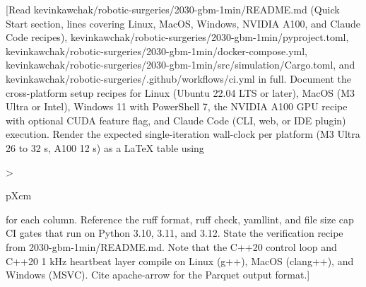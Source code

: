 [Read
kevinkawchak/robotic-surgeries/2030-gbm-1min/README.md (Quick Start
section, lines covering Linux, MacOS, Windows, NVIDIA A100, and
Claude Code recipes),
kevinkawchak/robotic-surgeries/2030-gbm-1min/pyproject.toml,
kevinkawchak/robotic-surgeries/2030-gbm-1min/docker-compose.yml,
kevinkawchak/robotic-surgeries/2030-gbm-1min/src/simulation/Cargo.toml,
and
kevinkawchak/robotic-surgeries/.github/workflows/ci.yml
in full. Document the cross-platform setup recipes for Linux
(Ubuntu 22.04 LTS or later), MacOS (M3 Ultra or Intel), Windows 11
with PowerShell 7, the NVIDIA A100 GPU recipe with optional CUDA
feature flag, and Claude Code (CLI, web, or IDE plugin) execution.
Render the expected single-iteration wall-clock per platform (M3 Ultra
26 to 32 s, A100 12 s) as a LaTeX table using
{>{\raggedright\arraybackslash}p{Xcm}} for each column. Reference the
ruff format, ruff check, yamllint, and file size cap CI gates that
run on Python 3.10, 3.11, and 3.12. State the verification recipe
from 2030-gbm-1min/README.md. Note that the C++20 control loop and
C++20 1 kHz heartbeat layer compile on Linux (g++), MacOS (clang++),
and Windows (MSVC). Cite apache-arrow for the Parquet output format.]
